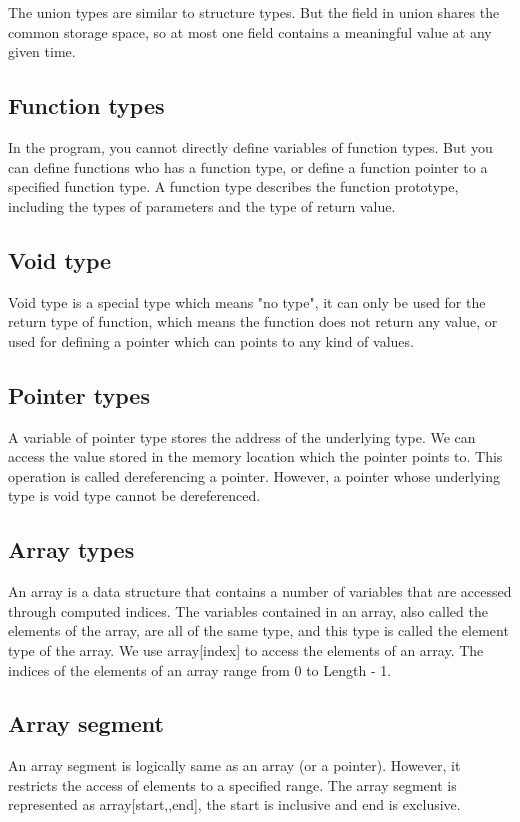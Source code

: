 \documentclass[a4paper]{article}
\begin{document}
{\color{blue}{}}

The union types are similar to structure types. But the field in union shares the common storage space, so at most one field contains a meaningful value at any given time.

{\subsection{Function types}}
In the program, you cannot directly define variables of function types. But you can define functions who has a function type, or define a function pointer to a specified function type.
A function type describes the function prototype, including the types of parameters and the type of return value.

{\subsection{Void type}}
Void type is a special type which means "no type", it can only be used for the return type of function, which means the function does not return any value, or used for defining a pointer which can points to any kind of values.

{\subsection{Pointer types}}
A variable of pointer type stores the address of the underlying type. We can access the value stored in the memory location which the pointer points to. This operation is called dereferencing a pointer. However, a pointer whose underlying type is void type cannot be dereferenced.

{\subsection{Array types}}
An array is a data structure that contains a number of variables that are accessed through computed indices. The variables contained in an array, also called the elements of the array, are all of the same type, and this type is called the element type of the array. We use array[index] to access the elements of an array. The indices of the elements of an array range from 0 to Length - 1.

{\subsection{Array segment}}
An array segment is logically same as an array (or a pointer). However, it restricts the access of elements to a specified range. The array segment is represented as array[start,,end], the start is inclusive and end is exclusive.
\end{document}
